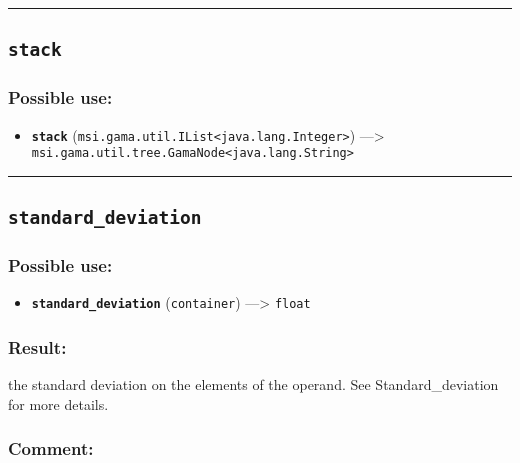 \documentclass[]{book}
\providecommand{\tightlist}{%
  \setlength{\itemsep}{0pt}\setlength{\parskip}{0pt}}
\theoremstyle{definition}
\theoremstyle{definition}
\theoremstyle{definition}
\theoremstyle{remark}
\begin{document}
\begin{center}\rule{0.5\linewidth}{\linethickness}\end{center}

\subsection{\texorpdfstring{\texttt{stack}}{stack}}\label{stack}

\subsubsection{Possible use:}\label{possible-use-501}

\begin{itemize}
\tightlist
\item
  \textbf{\texttt{stack}}
  (\texttt{msi.gama.util.IList\textless{}java.lang.Integer\textgreater{}})
  ---\textgreater{}
  \texttt{msi.gama.util.tree.GamaNode\textless{}java.lang.String\textgreater{}}
\end{itemize}

\begin{center}\rule{0.5\linewidth}{\linethickness}\end{center}

\subsection{\texorpdfstring{\texttt{standard\_deviation}}{standard\_deviation}}\label{standard_deviation}

\subsubsection{Possible use:}\label{possible-use-502}

\begin{itemize}
\tightlist
\item
  \textbf{\texttt{standard\_deviation}} (\texttt{container})
  ---\textgreater{} \texttt{float}
\end{itemize}

\subsubsection{Result:}\label{result-485}

the standard deviation on the elements of the operand. See
Standard\_deviation for more details.

\subsubsection{Comment:}\label{comment-94}
\end{document}
